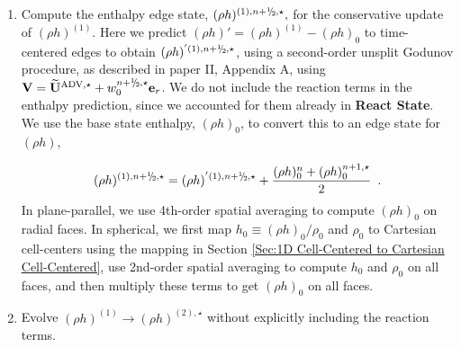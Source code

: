 \begin{description}
\begin{enumerate}
  \begin{enumerate}
  \renewcommand{\labelenumii}{{\bf \roman{enumii}}.}

  \item Compute the enthalpy edge state, $(\rho h)^{(1),\nph,\star},$
    for the conservative update of $(\rho h)^{(1)}.$  Here we predict 
    $(\rho h)' = (\rho h)^{(1)} - (\rho h)_0$ to time-centered edges to obtain 
    $(\rho h)^{'(1),\nph,\star}$, 
    using a second-order unsplit Godunov procedure, 
    as described in paper II, Appendix A, using $\Vb =
    \uadvone+w_0^{\nph,\star} \er$.  We do not include the reaction
    terms in the enthalpy prediction, since we accounted for them
    already in {\bf React State}.  We use the base state enthalpy,
    $(\rho h)_0$, to convert this to an edge state for $(\rho h)$,

    
\begin{equation}
(\rho h)^{(1),\nph,\star} = 
(\rho h)^{'(1),\nph,\star} + \frac{(\rho h)_0^n + (\rho h)_0^{n+1,\star}}{2}
\enskip .
\end{equation}
  In plane-parallel, we use 4th-order spatial averaging to compute $(\rho h)_0$
  on radial faces.  In spherical, we first map $h_0 \equiv (\rho h)_0/\rho_0$ 
  and $\rho_0$ to Cartesian cell-centers using the mapping in Section 
  \ref{Sec:1D Cell-Centered to Cartesian Cell-Centered}, use 2nd-order spatial 
  averaging to compute $h_0$ and $\rho_0$ on all faces, and then multiply these 
  terms to get $(\rho h)_0$ on all faces.

  \item Evolve $(\rho h)^{(1)} \rightarrow (\rho h)^{(2),\star}$ without
  explicitly including the reaction terms.

\end{enumerate}
\end{enumerate}
\end{description}
